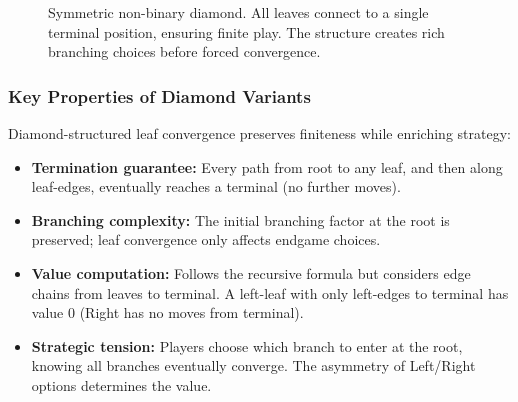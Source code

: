 \documentclass[10pt,a4paper,twocolumn]{article}
\theoremstyle{plain}
\theoremstyle{definition}
\theoremstyle{remark}
\begin{document}
\begin{figure}[h!]
\centering
{}
\vspace{10pt}
\caption{Symmetric non-binary diamond. All leaves connect to a single terminal position, ensuring finite play. The structure creates rich branching choices before forced convergence.}
\end{figure}

\vspace{14pt}

\subsubsection{Key Properties of Diamond Variants}

Diamond-structured leaf convergence preserves finiteness while enriching strategy:
\begin{itemize}
\item \textbf{Termination guarantee:} Every path from root to any leaf, and then along leaf-edges, eventually reaches a terminal (no further moves).
\item \textbf{Branching complexity:} The initial branching factor at the root is preserved; leaf convergence only affects endgame choices.
\item \textbf{Value computation:} Follows the recursive formula but considers edge chains from leaves to terminal. A left-leaf with only left-edges to terminal has value $0$ (Right has no moves from terminal).
\item \textbf{Strategic tension:} Players choose which branch to enter at the root, knowing all branches eventually converge. The asymmetry of Left/Right options determines the value.
\end{itemize}
\end{document}

